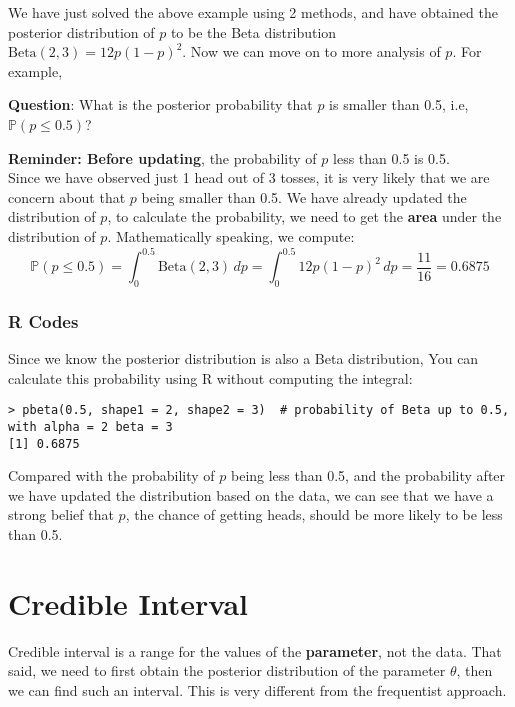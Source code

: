 \documentclass{article}
\begin{document}
We have just solved the above example using 2 methods, and have obtained the posterior distribution of $p$ to be the Beta distribution $\text{Beta}(2, 3) = 12p(1-p)^2$. Now we can move on to more analysis of $p$. For example, 
\begin{displayquote}
	\textbf{Question}: What is the posterior probability that $p$ is smaller than 0.5, i.e, $\mathbb{P}(p\leq 0.5)$?
\end{displayquote}

\textbf{Reminder: Before updating}, the probability of $p$ less than 0.5 is 0.5. \\

Since we have observed just 1 head out of 3 tosses, it is very likely that we are concern about that $p$ being smaller than 0.5. We have already updated the distribution of $p$, to calculate the probability, we need to get the \textbf{area} under the distribution of $p$. Mathematically speaking, we compute:
$$ \mathbb{P}(p\leq 0.5) = \int_0^{0.5} \text{Beta}(2, 3)\, dp = \int_0^{0.5}12p(1-p)^2\, dp = \frac{11}{16} = 0.6875 $$

\subsubsection*{R Codes}

Since we know the posterior distribution is also a Beta distribution, You can calculate this probability using R without computing the integral:
\begin{lstlisting}
> pbeta(0.5, shape1 = 2, shape2 = 3)  # probability of Beta up to 0.5, with alpha = 2 beta = 3
[1] 0.6875
\end{lstlisting}

Compared with the probability of $p$ being less than 0.5, and the probability after we have updated the distribution based on the data, we can see that we have a strong belief that $p$, the chance of getting heads, should be more likely to be less than 0.5. 

\section{Credible Interval}

Credible interval is a range for the values of the \textbf{parameter}, not the data. That said, we need to first obtain the posterior distribution of the parameter $\theta$, then we can find such an interval. This is very different from the frequentist approach.
\end{document}

